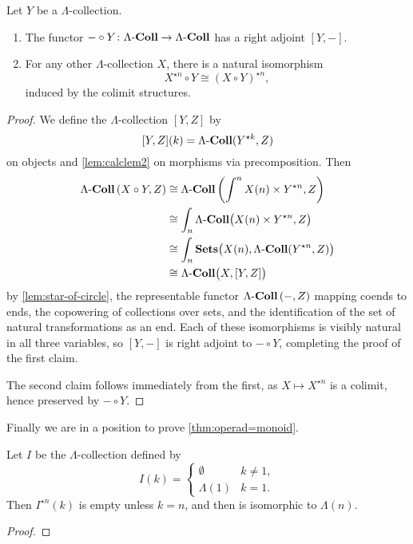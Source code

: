 \begin{cor}\label{cor:circ-adj}
Let $Y$ be a $\Lambda$-collection.
\begin{enumerate}
\item The functor $- \circ Y \colon \Lambda\mathbf{\mbox{-}Coll} \to \Lambda\mathbf{\mbox{-}Coll}$ has a right adjoint $[Y, -]$.
\item For any other $\Lambda$-collection $X$, there is a natural isomorphism
\[
X^{\star n} \circ Y \cong (X \circ Y)^{\star n},
\]
induced by the colimit structures.
\end{enumerate}
\end{cor}
\begin{proof}
We define the $\Lambda$-collection $[Y, Z]$ by
\[
[Y,Z](k) = \Lambda\mathbf{\mbox{-}Coll}(Y^{\star k}, Z)
\]
on objects and \cref{lem:calclem2} on morphisms via precomposition. 
Then
\begin{align*}
\Lambda\mathbf{\mbox{-}Coll}\left( X \circ Y, Z \right) & \cong \Lambda\mathbf{\mbox{-}Coll}\left( \int^{n} X(n) \times Y^{\star n}, Z \right) \\
& \cong \int_{n} \Lambda\mathbf{\mbox{-}Coll}\big(  X(n) \times Y^{\star n}, Z \big) \\
& \cong \int_{n} \mathbf{Sets}\big(  X(n), \Lambda\mathbf{\mbox{-}Coll}(Y^{\star n}, Z) \big) \\
& \cong \Lambda\mathbf{\mbox{-}Coll}\big( X, [Y,Z] \big)
\end{align*}
by \cref{lem:star-of-circle}, the representable functor $\Lambda\mathbf{\mbox{-}Coll}\left( -, Z \right)$ mapping coends to ends, the copowering of collections over sets, and the identification of the set of natural transformations as an end. 
Each of these isomorphisms is visibly natural in all three variables, so  $[Y, -]$ is right adjoint to $- \circ Y$, completing the proof of the first claim.

The second claim follows immediately from the first, as $X \mapsto X^{\star n}$ is a colimit, hence preserved by $- \circ Y$. 
\end{proof}

Finally we are in a position to prove \cref{thm:operad=monoid}. 

\begin{lem}\label{lem:Istarn(k)}
Let $I$ be the $\Lambda$-collection defined by
\[
I(k) = \left\{ \begin{array}{lr}
\emptyset & k \neq 1, \\
\Lambda(1) & k=1.
\end{array} \right.
\]
Then $I^{\star n} (k)$ is empty unless $k=n$, and then is isomorphic to $\Lambda(n)$.
\end{lem}
\begin{proof}
\end{proof}

